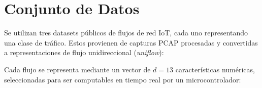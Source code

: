\section{Conjunto de Datos}
\label{sec:dataset}

Se utilizan tres datasets públicos de flujos de red IoT, cada uno representando una clase de tráfico. Estos provienen de capturas PCAP procesadas y convertidas a representaciones de flujo unidireccional (\emph{uniflow}):

\begin{table}[H]
\centering
\caption{Composición del dataset de flujos de red.}
\label{tab:dataset_comp}
\end{table}

Cada flujo se representa mediante un vector de $d = 13$ características numéricas, seleccionadas para ser computables en tiempo real por un microcontrolador:

